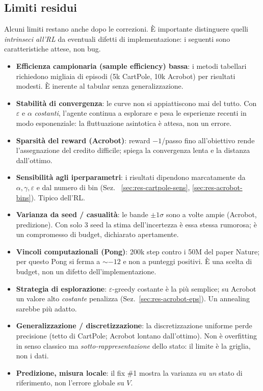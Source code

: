 \subsection{Limiti residui}
\label{sec:lessons-limits}
Alcuni limiti restano anche dopo le correzioni. \`E importante distinguere quelli
\emph{intrinseci all'RL} da eventuali difetti di implementazione: i seguenti sono
caratteristiche attese, non bug.
\begin{itemize}[nosep]
  \item \textbf{Efficienza campionaria (sample efficiency) bassa}: i metodi
        tabellari richiedono migliaia di episodi (5k CartPole, 10k Acrobot) per
        risultati modesti. \`E inerente al tabular senza generalizzazione.
  \item \textbf{Stabilit\`a di convergenza}: le curve non si appiattiscono mai del
        tutto. Con $\varepsilon$ e $\alpha$ \emph{costanti}, l'agente continua a
        esplorare e pesa le esperienze recenti in modo esponenziale: la
        fluttuazione asintotica \`e attesa, non un errore.
  \item \textbf{Sparsit\`a del reward (Acrobot)}: reward $-1$/passo fino
        all'obiettivo rende l'assegnazione del credito difficile; spiega la
        convergenza lenta e la distanza dall'ottimo.
  \item \textbf{Sensibilit\`a agli iperparametri}: i risultati dipendono
        marcatamente da $\alpha,\gamma,\varepsilon$ e dal numero di bin (Sez.~
        \ref{sec:res-cartpole-sens}, \ref{sec:res-acrobot-bins}). Tipico dell'RL.
  \item \textbf{Varianza da seed / casualit\`a}: le bande $\pm1\sigma$ sono a
        volte ampie (Acrobot, predizione). Con solo 3 seed la stima
        dell'incertezza \`e essa stessa rumorosa; \`e un compromesso di budget,
        dichiarato apertamente.
  \item \textbf{Vincoli computazionali (Pong)}: 200k step contro i 50M del paper
        Nature; per questo Pong si ferma a $\sim$$-12$ e non a punteggi positivi.
        \`E una scelta di budget, non un difetto dell'implementazione.
  \item \textbf{Strategia di esplorazione}: $\varepsilon$-greedy costante \`e la
        pi\`u semplice; su Acrobot un valore alto \emph{costante} penalizza
        (Sez.~\ref{sec:res-acrobot-eps}). Un annealing sarebbe pi\`u adatto.
  \item \textbf{Generalizzazione / discretizzazione}: la discretizzazione
        uniforme perde precisione (tetto di CartPole; Acrobot lontano
        dall'ottimo). Non \`e overfitting in senso classico ma
        \emph{sotto-rappresentazione} dello stato: il limite \`e la griglia, non
        i dati.
  \item \textbf{Predizione, misura locale}: il fix \#1 mostra la varianza su
        \emph{un} stato di riferimento, non l'errore globale su $V$.
\end{itemize}

